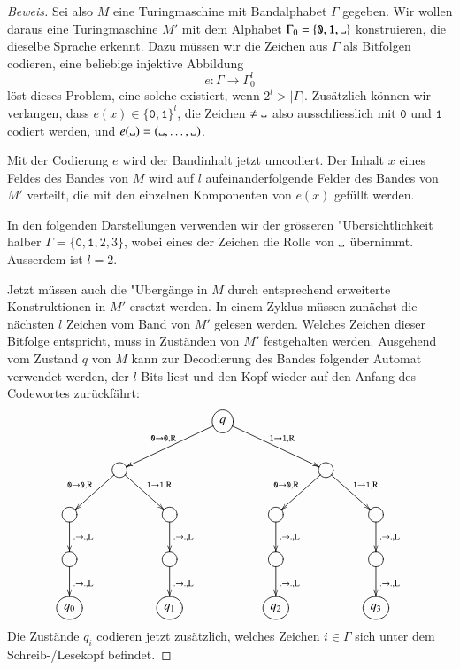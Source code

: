 \begin{proof}[Beweis]
Sei also $M$ eine Turingmaschine mit Bandalphabet $\Gamma$ gegeben. Wir
wollen daraus eine Turingmaschine $M'$ mit dem Alphabet
$\Gamma_0= \{\texttt{0},\texttt{1},\blank\}$ konstruieren, die dieselbe
Sprache erkennt. Dazu müssen wir die Zeichen aus $\Gamma$ als
Bitfolgen codieren, eine beliebige injektive Abbildung
\[
e\colon\Gamma\to \Gamma_0^l
\]
löst dieses Problem, eine solche existiert, wenn $2^l>|\Gamma|$.
Zusätzlich können
wir verlangen, dass $e(x)\in \{\texttt{0},\texttt{1}\}^l$, die Zeichen $\ne\blank$
also ausschliesslich mit $\texttt{0}$ und $\texttt{1}$ codiert werden, und
$e(\blank)=(\blank,\dots,\blank)$.

Mit der Codierung $e$ wird der Bandinhalt jetzt umcodiert. Der Inhalt
$x$
eines Feldes des Bandes von $M$ wird auf $l$ aufeinanderfolgende Felder
des Bandes von $M'$ verteilt, die mit den einzelnen Komponenten
von $e(x)$ gefüllt werden.

In den folgenden Darstellungen verwenden wir der grösseren
"Ubersichtlichkeit halber $\Gamma=\{\texttt{0},\texttt{1},2,3\}$, wobei eines der
Zeichen die Rolle von $\blank$ übernimmt. Ausserdem ist $l=2$.

Jetzt müssen auch die "Ubergänge in $M$
durch entsprechend erweiterte Konstruktionen in $M'$ ersetzt werden.
In einem Zyklus müssen zunächst die nächsten $l$ Zeichen vom Band
von $M'$ gelesen werden. Welches Zeichen dieser Bitfolge entspricht,
muss in Zuständen von $M'$ festgehalten werden. Ausgehend vom Zustand
$q$ von $M$ kann zur Decodierung
des Bandes folgender Automat verwendet werden, der $l$ Bits liest
und den Kopf wieder auf den Anfang des Codewortes zurückfährt:
\[
\entrymodifiers={++[o][F]}
\xymatrix{
*+\txt{}
	&*+\txt{}
		&*+\txt{}
			&q\ar[dll]_{\texttt{0}\to \texttt{0},\text{R}} \ar[drr]^{\texttt{1}\to \texttt{1},\text{R}}
\\
*+\txt{}
	&\ar[dl]_{\texttt{0}\to \texttt{0},\text{R}} \ar[dr]^{\texttt{1}\to \texttt{1},\text{R}}
		&*+\txt{}
			&*+\txt{}
				&*+\txt{}
					&\ar[dl]_{\texttt{0}\to \texttt{0},\text{R}} \ar[dr]^{\texttt{1}\to \texttt{1},\text{R}}
						&*+\txt{}
\\
\ar[d]^{.\to .,\text{L}}
	&*+\txt{}
		&\ar[d]^{.\to .,\text{L}}
			&*+\txt{}
				&\ar[d]^{.\to .,\text{L}}
					&*+\txt{}
						&\ar[d]^{.\to .,\text{L}}
\\
\ar[d]^{.\to .,\text{L}}
	&*+\txt{}
		&\ar[d]^{.\to .,\text{L}}
			&*+\txt{}
				&\ar[d]^{.\to .,\text{L}}
					&*+\txt{}
						&\ar[d]^{.\to .,\text{L}}
\\
q_0
	&*+\txt{}
		&q_1
			&*+\txt{}
				&q_2
					&*+\txt{}
						&q_3
}
\]
Die Zustände $q_i$ codieren jetzt zusätzlich, welches
Zeichen $i\in\Gamma$ sich unter dem Schreib-/Lesekopf befindet.


\end{proof}
